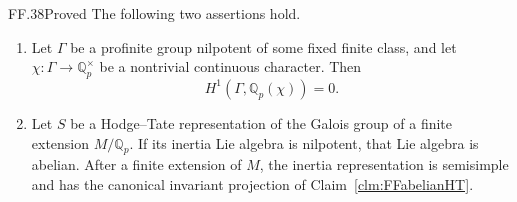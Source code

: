 \begin{claim}{FF.38}{Proved}\label{clm:FFnilpotentinputs}
The following two assertions hold.
\begin{enumerate}
\item Let \(\Gamma\) be a profinite group
nilpotent of some fixed finite class, and let
\(\chi:\Gamma\to\mathbb Q_p^\times\) be a
nontrivial continuous character. Then
\[
                 H^1(\Gamma,\mathbb Q_p(\chi))=0.
                                                        \tag{FF.38.1}
\]
\item Let \(S\) be a Hodge--Tate representation
of the Galois group of a finite extension
\(M/\mathbb Q_p\). If its inertia Lie algebra
is nilpotent, that Lie algebra is abelian.
After a finite extension of \(M\), the
inertia representation is semisimple and
has the canonical invariant projection
of Claim~\ref{clm:FFabelianHT}.
\end{enumerate}
\end{claim}
